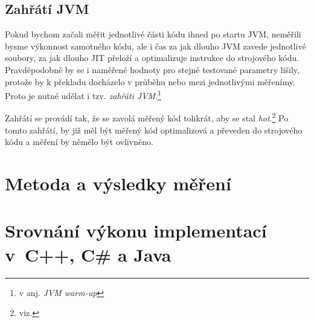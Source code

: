 \subsection{Zahřátí JVM}

Pokud bychom začali měřit jednotlivé části kódu ihned po startu JVM, neměřili bysme výkonnost samotného kódu, ale i čas za jak dlouho JVM zavede jednotlivé \classfile soubory, za jak dlouho JIT přeloží a optimalizuje instrukce \bytecode{} do strojového kódu. Pravděpodobně by se i naměřené hodnoty pro stejné testované parametry lišily, protože by k překladu docházelo v průběhu nebo mezi jednotlivými měřenímy. Proto je nutné udělat i tzv. \emph{zahřáti JVM}.\footnote{v anj. \emph{JVM warm-up}}

Zahřátí se provádí tak, že se zavolá měřený kód tolikrát, aby se stal \emph{hot}.\footnote{viz. } Po tomto zahřátí, by již měl být měřený kód optimalizová a převeden do strojového kódu a měření by němělo být ovlivněno.

\section{Metoda a výsledky měření}

\section{Srovnání výkonu implementací v~C++, C\# a Java}
